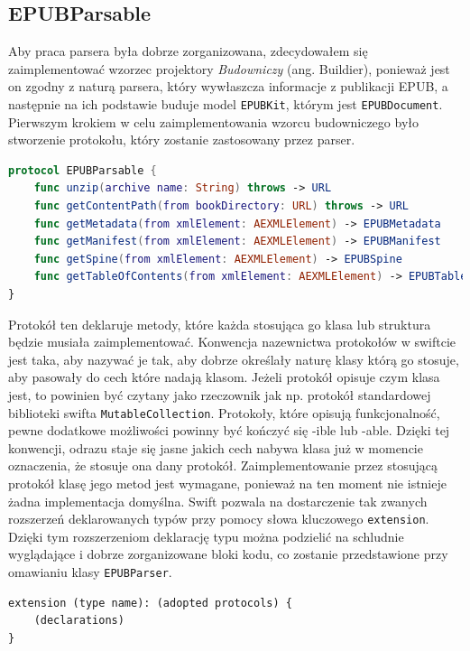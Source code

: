\subsection{EPUBParsable}

Aby praca parsera była dobrze zorganizowana, zdecydowałem się zaimplementować wzorzec projektory \textit{Budowniczy} (ang. Buildier), ponieważ jest on zgodny z naturą parsera, który wywłaszcza informacje z publikacji EPUB, a następnie na ich podstawie buduje model \texttt{EPUBKit}, którym jest \texttt{EPUBDocument}. Pierwszym krokiem w celu zaimplementowania wzorcu budowniczego było stworzenie protokołu, który zostanie zastosowany przez parser.

\begin{lstlisting}[caption={Protokół EPUBParsable}, language=swift,label=fghj]
protocol EPUBParsable {
    func unzip(archive name: String) throws -> URL
    func getContentPath(from bookDirectory: URL) throws -> URL
    func getMetadata(from xmlElement: AEXMLElement) -> EPUBMetadata
    func getManifest(from xmlElement: AEXMLElement) -> EPUBManifest
    func getSpine(from xmlElement: AEXMLElement) -> EPUBSpine
    func getTableOfContents(from xmlElement: AEXMLElement) -> EPUBTableOfContents
}
\end{lstlisting}

Protokół ten deklaruje metody, które każda stosująca go klasa lub struktura będzie musiała zaimplementować. Konwencja nazewnictwa protokołów w swiftcie jest taka, aby nazywać je tak, aby dobrze określały naturę klasy którą go stosuje, aby pasowały do cech które nadają klasom. Jeżeli protokół opisuje czym klasa jest, to powinien być czytany jako rzeczownik jak np. protokół standardowej biblioteki swifta \texttt{MutableCollection}. Protokoły, które opisują funkcjonalność, pewne dodatkowe możliwości powinny być kończyć się -ible lub -able. Dzięki tej konwencji, odrazu staje się jasne jakich cech nabywa klasa już w momencie oznaczenia, że stosuje ona dany protokół. Zaimplementowanie przez stosującą protokół klasę jego metod jest wymagane, ponieważ na ten moment nie istnieje żadna implementacja domyślna. Swift pozwala na dostarczenie tak zwanych rozszerzeń deklarowanych typów przy pomocy słowa kluczowego \texttt{extension}. Dzięki tym rozszerzeniom deklarację typu można podzielić na schludnie wyglądające i dobrze zorganizowane bloki kodu, co zostanie przedstawione przy omawianiu klasy \texttt{EPUBParser}.

\begin{lstlisting}[caption={Deklaracja wyrażenia \texttt{extension}\cite{theSwiftProgrammingLanguageDeclarations}},language=swift-reference,label=sdfghjk]
extension (type name): (adopted protocols) {
    (declarations)
}
\end{lstlisting}

